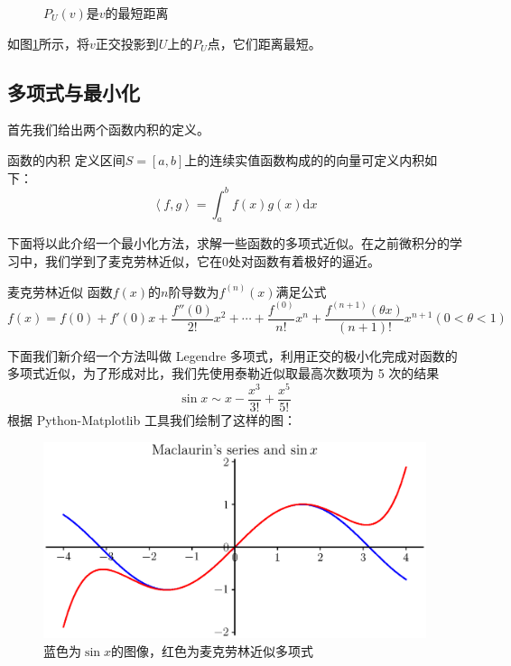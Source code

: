 \begin{figure}[htbp]
	\centering
	
	\caption{$P_U(v)$是$v$的最短距离}
	\label{tikz:botDistanceLine}
\end{figure}

如图\ref{tikz:botDistanceLine}所示，将$v$正交投影到$U$上的$P_U$点，它们距离最短。

\subsection{多项式与最小化}

首先我们给出两个函数内积的定义。

\begin{definition}{函数的内积}
	定义区间$S=\left[ a,b \right]$上的连续实值函数构成的的向量可定义内积如下：
	$$\left \langle f,g \right \rangle =\int_{a}^{b} f(x)g(x)\mathrm{d}x $$
\end{definition}

下面将以此介绍一个最小化方法，求解一些函数的多项式近似。在之前微积分的学习中，我们学到了麦克劳林近似，它在0处对函数有着极好的逼近。

\begin{theorem}{麦克劳林近似}
	函数$f(x)$的$n$阶导数为$f^{(n)}(x)$满足公式$$f(x)=f(0)+f'(0)x+\frac{f''(0)}{2!}x^2+\cdots+\frac{f^{(0)}}{n!}x^n+\frac{f^{(n+1)}(\theta x)}{(n+1)!}x^{n+1}(0<\theta<1)$$
\end{theorem}

下面我们新介绍一个方法叫做 Legendre 多项式，利用正交的极小化完成对函数的多项式近似，为了形成对比，我们先使用泰勒近似取最高次数项为 5 次的结果$$\sin x\sim x-\frac{x^3}{3!}+\frac{x^5}{5!}$$根据 Python-Matplotlib 工具我们绘制了这样的图：

\begin{figure}[htbp]
	\centering
	\includegraphics[width=0.7\linewidth]{figure/eps/FunctionPolMaclaurin.eps}
	\caption{蓝色为$\sin x$的图像，红色为麦克劳林近似多项式}
	\label{fig:Maclaurin}
\end{figure}

